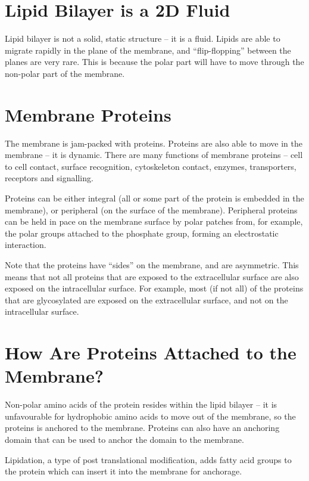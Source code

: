 \section{Lipid Bilayer is a 2D Fluid}

\begin{center}
\end{center}

Lipid bilayer is not a solid, static structure -- it is a fluid.
Lipids are able to migrate rapidly in the plane of the membrane, and ``flip-flopping'' between the planes are very rare.
This is because the polar part will have to move through the non-polar part of the membrane.

\section{Membrane Proteins}

The membrane is jam-packed with proteins.
Proteins are also able to move in the membrane -- it is dynamic.
There are many functions of membrane proteins -- cell to cell contact, surface recognition, cytoskeleton contact, enzymes, transporters, receptors and signalling.

Proteins can be either integral (all or some part of the protein is embedded in the membrane), or peripheral (on the surface of the membrane).
Peripheral proteins can be held in pace on the membrane surface by polar patches from, for example, the polar groups attached to the phosphate group, forming an electrostatic interaction.

Note that the proteins have ``sides'' on the membrane, and are asymmetric.
This means that not all proteins that are exposed to the extracellular surface are also exposed on the intracellular surface.
For example, most (if not all) of the proteins that are glycosylated are exposed on the extracellular surface, and not on the intracellular surface.

\section{How Are Proteins Attached to the Membrane?}

Non-polar amino acids of the protein resides within the lipid bilayer -- it is unfavourable for hydrophobic amino acids to move out of the membrane, so the proteins is anchored to the membrane.
Proteins can also have an anchoring domain that can be used to anchor the domain to the membrane.

Lipidation, a type of post translational modification, adds fatty acid groups to the protein which can insert it into the membrane for anchorage.

\begin{center}
\end{center}








